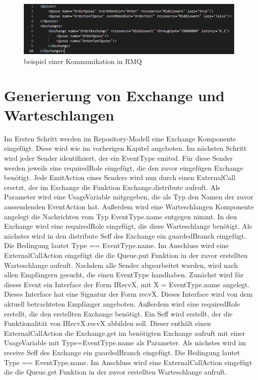 \begin{figure}
\center
  \includegraphics[width=1\textwidth]{code/configExample.png}
  \caption{beispiel einer Kommunikation in RMQ}
  \label{img:configExample}
\end{figure}

\section{Generierung von Exchange und Warteschlangen}
Im Ersten Schritt werden im Repository-Modell eine Exchange Komponente eingefügt. Diese wird wie im vorherigen Kapitel angeboten. Im nächsten Schritt wird jeder Sender identifiziert, der ein EventType emited. Für diese Sender werden jeweils eine requiredRole eingefügt, die den zuvor eingefügen Exchange benötigt. Jede EmitAction eines Senders wird nun durch einen ExternalCall ersetzt, der im Exchange die Funktion Exchange.distribute aufruft. Als Parameter wird eine UsageVariable mitgegeben, die als Typ den Namen der zuvor aussendenden EventAction hat. Außerdem wird eine Warteschlangen Komponente angelegt die Nachrichten vom Typ EventType.name entgegen nimmt. In den Exchange wird eine requiredRole eingefügt, die diese Warteschlange benötigt. Als nächstes wird in den distribute Seff des Exchange ein guardedBranch eingefügt. Die Bedingung lautet Type == EventType.name. Im Anschluss wird eine ExternalCallAction eingefügt die die Queue.put Funktion in der zuvor erstellten Warteschlange aufruft. Nachdem alle Sender abgearbeitet wurden, wird nach allen Empfängern gesucht, die einen EventType handhaben. Zunächst wird für dieses Event ein Interface der Form IRecvX, mit X = EventType.name angelegt. Dieses Interface hat eine Signatur der Form recvX. Dieses Interface wird von dem aktuell betrachteten Empfänger angeboten. Außerdem wird eine requiredRole erstellt, die den erstellten Exchange benötigt. Ein Seff wird erstellt, der die Funktionalität von IRecvX.recvX abbilden soll. Dieser enthält einen ExternalCallAction die Exchange.get im benötigten Exchange aufruft mit einer UsageVariable mit Type=EventType.name als Parameter. Als nächstes wird im receive Seff des Exchange ein guardedBranch eingefügt. Die Bedingung lautet Type == EventType.name. Im Anschluss wird eine ExternalCallAction eingefügt die die Queue.get Funktion in der zuvor erstellten Warteschlange aufruft.

